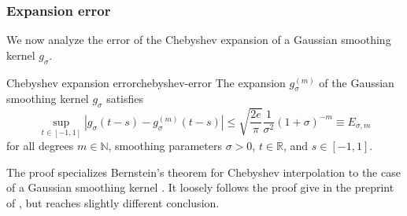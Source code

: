 \documentclass[12pt]{article}
\begin{document}
\subsubsection{Expansion error}
\label{subsubsec:expansion-error}

We now analyze the error of the Chebyshev expansion of a Gaussian smoothing kernel $g_{\sigma}$.

\begin{lemma}{Chebyshev expansion error}{chebyshev-error}
    The expansion $g_{\sigma}^{(m)}$ of the Gaussian smoothing kernel $g_{{\sigma}}$  satisfies
    \begin{equation}
        \sup_{t \in [-1, 1]} \left| g_{\sigma}(t - s) - g_{\sigma}^{(m)}(t - s) \right| \leq \sqrt{\frac{2e}{\pi}} \frac{1}{\sigma^2} (1 + \sigma)^{-m} \equiv E_{\sigma, m}
        \label{equ:2-chebyshev-interpolation-sup-error-kernel}
    \end{equation}
    for all degrees $m \in \mathbb{N}$, smoothing parameters $\sigma > 0$, $t \in \mathbb{R}$, and $s \in [-1, 1]$.
\end{lemma}

The proof specializes Bernstein's theorem for Chebyshev interpolation to the case of a Gaussian smoothing kernel . It loosely follows the proof give in the preprint of \cite[theorem 2]{lin-2017-randomized-estimation}, but reaches slightly different conclusion.
\end{document}
